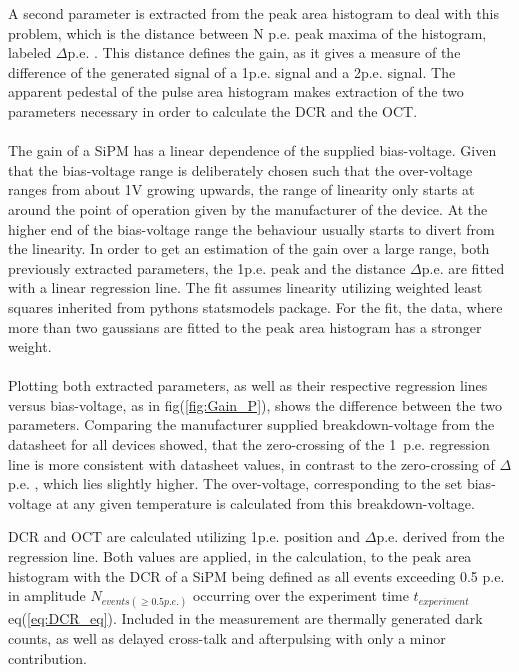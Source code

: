 \documentclass[12pt,article,type=msc,colorback,accentcolor=tud9c]{tudthesis}
\begin{document}
A second parameter is extracted from the peak area histogram to deal with this problem, which is the distance between N p.e. peak maxima of the histogram, labeled $\Delta$p.e. . This distance defines the gain, as it gives a measure of the difference of the generated signal of a 1p.e. signal and a 2p.e. signal. The apparent pedestal of the pulse area histogram makes extraction of the two parameters necessary in order to calculate the DCR and the OCT.\\\\ The gain of a SiPM has a linear dependence of the supplied bias-voltage. Given that the bias-voltage range is deliberately chosen such that the over-voltage ranges from about 1V growing upwards, the range of linearity only starts at around the point of operation given by the manufacturer of the device. At the higher end of the bias-voltage range the behaviour usually starts to divert from the linearity. In order to get an estimation of the gain over a large range, both previously extracted parameters, the 1p.e. peak and the distance $\Delta$p.e. are fitted with a linear regression line. The fit assumes linearity utilizing weighted least squares inherited from pythons statsmodels package. For the fit, the data, where more than two gaussians are fitted to the peak area histogram has a stronger weight.\\\\ Plotting both extracted parameters, as well as their respective regression lines versus bias-voltage, as in fig(\ref{fig:Gain_P}), shows the difference between the two parameters. Comparing the manufacturer supplied breakdown-voltage from the datasheet for all devices showed, that the zero-crossing of the 1~p.e. regression line is more consistent with datasheet values, in contrast to the zero-crossing of $\Delta$p.e. , which lies slightly higher. The over-voltage, corresponding to the set bias-voltage at any given temperature is calculated from this breakdown-voltage. 


DCR and OCT are calculated utilizing 1p.e. position and $\Delta$p.e. derived from the regression line. Both values are applied, in the calculation, to the peak area histogram with the DCR of a SiPM being defined as all events exceeding 0.5 p.e. in amplitude $N_{events(\geq 0.5p.e.)}$ occurring over the experiment time $t_{experiment}$ eq(\ref{eq:DCR_eq}). Included in the measurement are thermally generated dark counts, as well as delayed cross-talk and afterpulsing with only a minor contribution.
\end{document}
